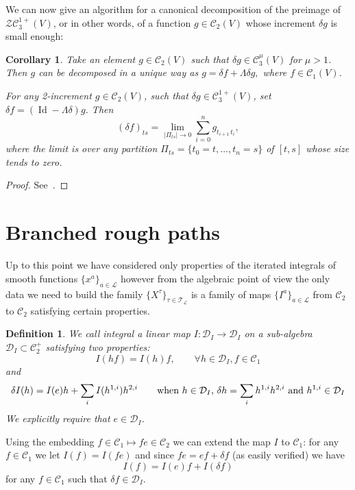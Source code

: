 \documentclass[a4paper,11pt,reqno]{article}
\newcommand{\cZ}{\mathcal{Z}}
\newcommand{\1}{{\bf 1}}
\DeclareMathOperator{\id}{\text{Id}}
\newcommand{\der}{\delta}
\newcommand{\CC}{\mathcal{C}}
\newcommand{\DD}{\mathcal{D}}
\newcommand{\LL}{\mathcal{L}}
\newtheorem{corollary}[theorem]{Corollary}
\newtheorem{definition}[theorem]{Definition}
\newcommand{\TT}{\mathcal{T}}
\begin{document}
\vspace{0.3cm}

We can now give an algorithm for a canonical decomposition of the
preimage of $\cZ \CC_3^{1+}(V)$, or in other words, of a function 
$g\in\CC_2 (V)$ whose increment $\der g$ is small enough:
\begin{corollary}
\label{cor:integration}
Take an element $g\in\CC_2 (V)$ such that $\der g\in\CC_3^\mu(V)$ for
$\mu>1$. Then $g$ can be decomposed in a unique way as
$
g=\der f+ \Lambda \delta g,
$
where $f\in\CC_1(V)$. 

For any 2-increment $g\in\CC_2 (V)$, such that $\der g\in\CC_3^{1+}(V)$,
set
$
\delta f = (\id-\Lambda \delta) g 
$.
Then
$$
(\delta f)_{ts} = \lim_{|\Pi_{ts}| \to 0} \sum_{i=0}^n g_{t_{i+1}\, t_i},
$$
where the limit is over any partition $\Pi_{ts} = \{t_0=t,\dots,
t_n=s\}$ of $[t,s]$ whose size tends to zero.
\end{corollary}

\begin{proof}
See~\cite{MR2091358}.
\end{proof}




\section{Branched rough paths}
\label{sec:brp}

Up to this point we have considered only properties of the iterated
integrals of smooth functions $\{x^a\}_{a\in \LL}$ however from the
algebraic point of view the only data we need to build the family
$\{X^\tau\}_{\tau \in \TT_\LL}$ is a family of maps $\{I^a\}_{a \in
  \LL}$ from $\CC_2$ to $\CC_2$ satisfying certain properties. 
 

\begin{definition}
\label{def:integral} We call \emph{integral} a linear map $I: \DD_I
   \to \DD_I$ on a sub-algebra $\DD_I \subset \CC^+_2$ satisfying two properties:
$$
I(hf) =  I(h) f, \qquad \forall h \in \DD_I, f \in \CC_1
$$
and 
$$
\der I(h) = I(e)h + \sum_i I(h^{1,i}) h^{2,i} \qquad \text{when $h\in
  \DD_I$, $ \der h = \sum_i h^{1,i} h^{2,i}$ and $h^{1,i} \in \DD_I$} 
$$
We explicitly require that $e \in \DD_I$.
\end{definition}

Using the embedding $f \in \CC_1 \mapsto fe \in \CC_2$ we can extend
the map $I$ to $\CC_1$: for any $f \in \CC_1$ we let $I(f) = I(fe)$
and since $fe = ef + \der f$  (as easily verified) we have
$$
I(f) = I(e)f + I(\der f) 
$$
for any $f \in \CC_1$ such that $\der f \in \DD_I$.
\end{document}

